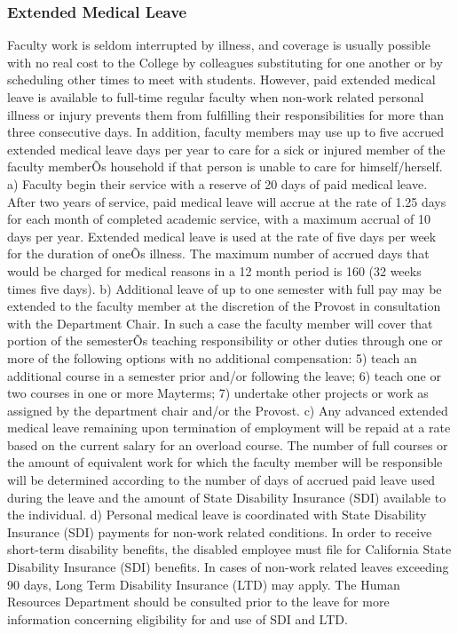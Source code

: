 \documentclass[letterpaper, 11pt]{article}
\begin{document}
		\subsubsection{Extended Medical Leave}
			Faculty work is seldom interrupted by illness, and coverage is usually possible with no real cost to the College by colleagues substituting for one another or by scheduling other times to meet with students.  However, paid extended medical leave is available to full-time regular faculty when non-work related personal illness or injury prevents them from fulfilling their responsibilities for more than three consecutive days.  In addition, faculty members may use up to five accrued extended medical leave days per year to care for a sick or injured member of the faculty memberÕs household if that person is unable to care for himself/herself.
			a) Faculty begin their service with a reserve of 20 days of paid medical leave.  After two years of service, paid medical leave will accrue at the rate of 1.25 days for each month of completed academic service, with a maximum accrual of 10 days per year.  Extended medical leave is used at the rate of five days per week for the duration of oneÕs illness. The maximum number of accrued days that would be charged for medical reasons in a 12 month period is 160 (32 weeks times five days).
			b) Additional leave of up to one semester with full pay may be extended to the faculty member at the discretion of the Provost in consultation with the Department Chair.  In such a case the faculty member will cover that portion of the semesterÕs teaching responsibility or other duties through one or more of the following options with no additional compensation:
			5) teach an additional course in a semester prior and/or following the leave;
			6) teach one or two courses in one or more Mayterms;
			7) undertake other projects or work as assigned by the department chair and/or the Provost.
			c) Any advanced extended medical leave remaining upon termination of employment will be repaid at a rate based on the current salary for an overload course.
			The number of full courses or the amount of equivalent work for which the faculty member will be responsible will be determined according to the number of days of accrued paid leave used during the leave and the amount of State Disability Insurance (SDI) available to the individual.
			d) Personal medical leave is coordinated with State Disability Insurance (SDI) payments for non-work related conditions. In order to receive short-term disability benefits, the disabled employee must file for California State Disability Insurance (SDI) benefits.  In cases of non-work related leaves exceeding 90 days, Long Term Disability Insurance (LTD) may apply.  The Human Resources Department should be consulted prior to the leave for more information concerning eligibility for and use of SDI and LTD.
\end{document}
